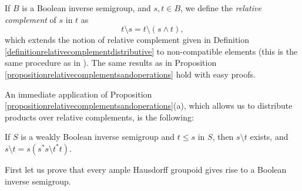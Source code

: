If $B$ is a Boolean inverse semigroup, and $s,t\in B$, we define the \emph{relative complement} of $s$ in $t$ as
\[t\setminus s=t\setminus(s\land t),\]
which extends the notion of relative complement given in Definition \ref{definitionrelativecomplementdistributive} to non-compatible elements (this is the same procedure as in \cite[Notation 3.1.11]{MR3700423}). The same results as in Proposition \ref{propositionrelativecomplementsandoperations} hold with easy proofs.

An immediate application of Proposition \ref{propositionrelativecomplementsandoperations}(a), which allows us to distribute products over relative complements, is the following:

\begin{proposition}\label{propositionrelativecomplementofsmallerelementinweaklybooleansemigroup}
If $S$ is a weakly Boolean inverse semigroup and $t\leq s$ in $S$, then $s\setminus t$ exists, and $s\setminus t=s(s^*s\setminus t^*t)$.
\end{proposition}
%
%


First let us prove that every ample Hausdorff groupoid gives rise to a Boolean inverse semigroup.

